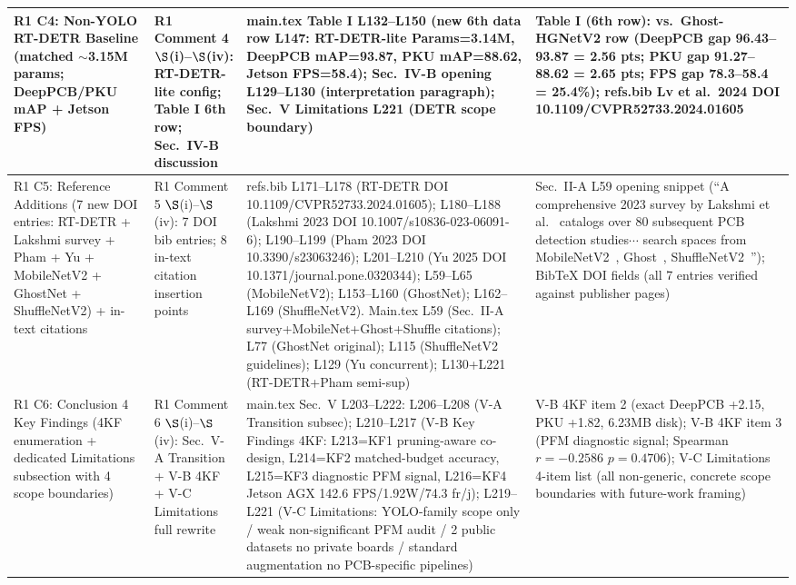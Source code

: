 \documentclass[conference]{IEEEtran}
\begin{document}
\begin{table}[t]
{\begin{tabular}{p{3.2cm} p{3.0cm} p{4.2cm} p{4.5cm}}
\midrule
R1 C4: Non-YOLO RT-DETR Baseline (matched $\sim$3.15M params; DeepPCB/PKU mAP + Jetson FPS) & R1 Comment 4 $\S$(i)--$\S$(iv): RT-DETR-lite config; Table I 6th row; Sec.~IV-B discussion & main.tex Table I L132--L150 (new 6th data row L147: RT-DETR-lite Params=3.14M, DeepPCB mAP=93.87, PKU mAP=88.62, Jetson FPS=58.4); Sec.~IV-B opening L129--L130 (interpretation paragraph); Sec.~V Limitations L221 (DETR scope boundary) & Table I (6th row): vs.~Ghost-HGNetV2 row (DeepPCB gap 96.43--93.87 = 2.56 pts; PKU gap 91.27--88.62 = 2.65 pts; FPS gap 78.3--58.4 = 25.4\%); refs.bib Lv et al.~2024 DOI 10.1109/CVPR52733.2024.01605 \\
\midrule
R1 C5: Reference Additions (7 new DOI entries: RT-DETR + Lakshmi survey + Pham + Yu + MobileNetV2 + GhostNet + ShuffleNetV2) + in-text citations & R1 Comment 5 $\S$(i)--$\S$(iv): 7 DOI bib entries; 8 in-text citation insertion points & refs.bib L171--L178 (RT-DETR DOI 10.1109/CVPR52733.2024.01605); L180--L188 (Lakshmi 2023 DOI 10.1007/s10836-023-06091-6); L190--L199 (Pham 2023 DOI 10.3390/s23063246); L201--L210 (Yu 2025 DOI 10.1371/journal.pone.0320344); L59--L65 (MobileNetV2); L153--L160 (GhostNet); L162--L169 (ShuffleNetV2). Main.tex L59 (Sec.~II-A survey+MobileNet+Ghost+Shuffle citations); L77 (GhostNet original); L115 (ShuffleNetV2 guidelines); L129 (Yu concurrent); L130+L221 (RT-DETR+Pham semi-sup) & Sec.~II-A L59 opening snippet (``A comprehensive 2023 survey by Lakshmi et al.~\cite{lakshmi2023pcb_survey} catalogs over 80 subsequent PCB detection studies$\cdots$ search spaces from MobileNetV2~\cite{sandler2018mobilenetv2}, Ghost~\cite{han2020ghostnet}, ShuffleNetV2~\cite{ma2018shufflenetv2}''); BibTeX DOI fields (all 7 entries verified against publisher pages) \\
\midrule
R1 C6: Conclusion 4 Key Findings (4KF enumeration + dedicated Limitations subsection with 4 scope boundaries) & R1 Comment 6 $\S$(i)--$\S$(iv): Sec.~V-A Transition + V-B 4KF + V-C Limitations full rewrite & main.tex Sec.~V L203--L222: L206--L208 (V-A Transition subsec); L210--L217 (V-B Key Findings 4KF: L213=KF1 pruning-aware co-design, L214=KF2 matched-budget accuracy, L215=KF3 diagnostic PFM signal, L216=KF4 Jetson AGX 142.6 FPS/1.92W/74.3 fr/j); L219--L221 (V-C Limitations: YOLO-family scope only / weak non-significant PFM audit / 2 public datasets no private boards / standard augmentation no PCB-specific pipelines) & V-B 4KF item 2 (exact DeepPCB +2.15, PKU +1.82, 6.23MB disk); V-B 4KF item 3 (PFM diagnostic signal; Spearman $r=-0.2586$ $p=0.4706$); V-C Limitations 4-item list (all non-generic, concrete scope boundaries with future-work framing) \\
\bottomrule
\end{tabular}}
\end{table}
\end{document}
